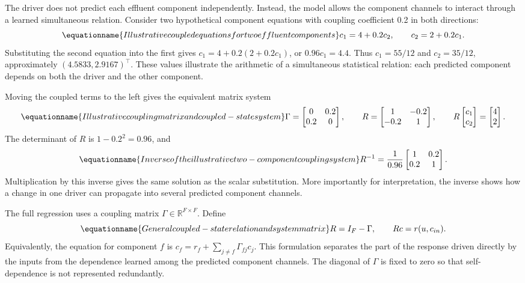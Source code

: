 The driver does not predict each effluent component independently. Instead, the model allows the component channels to interact through a learned simultaneous relation. Consider two hypothetical component equations with coupling coefficient 0.2 in both directions:
\begin{equation}
\equationname{Illustrative coupled equations for two effluent components}
\label{eq:icsor_scalar_coupling_example}
c_1=4+0.2c_2,
\qquad c_2=2+0.2c_1.
\end{equation}
Substituting the second equation into the first gives \(c_1=4+0.2(2+0.2c_1)\), or \(0.96c_1=4.4\). Thus \(c_1=55/12\) and \(c_2=35/12\), approximately \((4.5833,2.9167)^\top\). These values illustrate the arithmetic of a simultaneous statistical relation: each predicted component depends on both the driver and the other component.

Moving the coupled terms to the left gives the equivalent matrix system
\begin{equation}
\equationname{Illustrative coupling matrix and coupled-state system}
\label{eq:icsor_small_coupling_matrices}
\Gamma=\begin{bmatrix}0&0.2\\0.2&0\end{bmatrix},
\qquad
R=\begin{bmatrix}1&-0.2\\-0.2&1\end{bmatrix},
\qquad
R\begin{bmatrix}c_1\\c_2\end{bmatrix}=\begin{bmatrix}4\\2\end{bmatrix}.
\end{equation}
The determinant of \(R\) is \(1-0.2^2=0.96\), and
\begin{equation}
\equationname{Inverse of the illustrative two-component coupling system}
\label{eq:icsor_small_coupling_inverse}
R^{-1}=\frac{1}{0.96}\begin{bmatrix}1&0.2\\0.2&1\end{bmatrix}.
\end{equation}
Multiplication by this inverse gives the same solution as the scalar substitution. More importantly for interpretation, the inverse shows how a change in one driver can propagate into several predicted component channels.

The full regression uses a coupling matrix \(\Gamma\in\mathbb{R}^{F\times F}\). Define
\begin{equation}
\equationname{General coupled-state relation and system matrix}
\label{eq:icsor_coupled_relation}
R=I_F-\Gamma,
\qquad Rc=r(u,c_{in}).
\end{equation}
Equivalently, the equation for component \(f\) is \(c_f=r_f+\sum_{j\neq f}\Gamma_{fj}c_j\). This formulation separates the part of the response driven directly by the inputs from the dependence learned among the predicted component channels. The diagonal of \(\Gamma\) is fixed to zero so that self-dependence is not represented redundantly.

